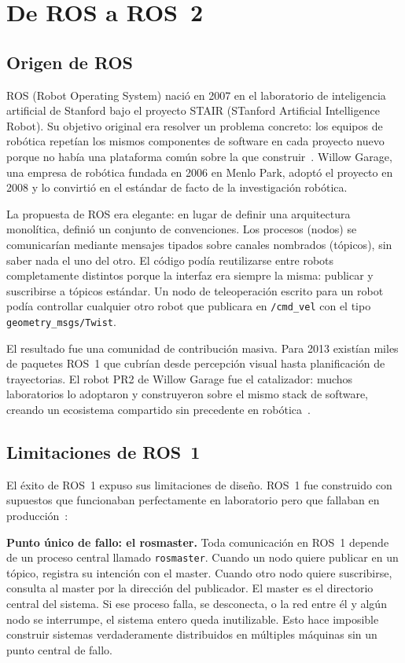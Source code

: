 \section{De ROS a ROS~2}

\subsection{Origen de ROS}

ROS (Robot Operating System) nació en 2007 en el laboratorio de inteligencia artificial de Stanford bajo el proyecto STAIR (STanford Artificial Intelligence Robot). Su objetivo original era resolver un problema concreto: los equipos de robótica repetían los mismos componentes de software en cada proyecto nuevo porque no había una plataforma común sobre la que construir~\cite{quigley2009ros}. Willow Garage, una empresa de robótica fundada en 2006 en Menlo Park, adoptó el proyecto en 2008 y lo convirtió en el estándar de facto de la investigación robótica.

La propuesta de ROS era elegante: en lugar de definir una arquitectura monolítica, definió un conjunto de convenciones. Los procesos (nodos) se comunicarían mediante mensajes tipados sobre canales nombrados (tópicos), sin saber nada el uno del otro. El código podía reutilizarse entre robots completamente distintos porque la interfaz era siempre la misma: publicar y suscribirse a tópicos estándar. Un nodo de teleoperación escrito para un robot podía controllar cualquier otro robot que publicara en \texttt{/cmd\_vel} con el tipo \texttt{geometry\_msgs/Twist}.

El resultado fue una comunidad de contribución masiva. Para 2013 existían miles de paquetes ROS~1 que cubrían desde percepción visual hasta planificación de trayectorias. El robot PR2 de Willow Garage fue el catalizador: muchos laboratorios lo adoptaron y construyeron sobre el mismo stack de software, creando un ecosistema compartido sin precedente en robótica~\cite{quigley2009ros}.

\subsection{Limitaciones de ROS~1}

El éxito de ROS~1 expuso sus limitaciones de diseño. ROS~1 fue construido con supuestos que funcionaban perfectamente en laboratorio pero que fallaban en producción~\cite{maruyama2016exploring}:

\textbf{Punto único de fallo: el rosmaster.} Toda comunicación en ROS~1 depende de un proceso central llamado \texttt{rosmaster}. Cuando un nodo quiere publicar en un tópico, registra su intención con el master. Cuando otro nodo quiere suscribirse, consulta al master por la dirección del publicador. El master es el directorio central del sistema. Si ese proceso falla, se desconecta, o la red entre él y algún nodo se interrumpe, el sistema entero queda inutilizable. Esto hace imposible construir sistemas verdaderamente distribuidos en múltiples máquinas sin un punto central de fallo.

